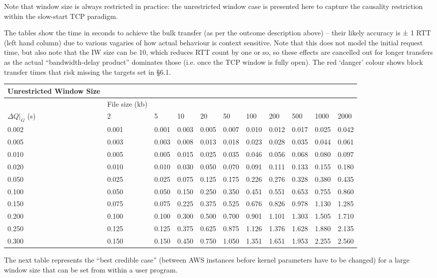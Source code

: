 \documentclass[11pt,a4paper]{article}
\begin{document}
Note that window size is always restricted in practice: the unrestricted
window case is presented here to capture the causality restriction
within the slow-start TCP paradigm.

The tables show the time in seconds to achieve the bulk transfer (as per
the outcome description above) -- their likely accuracy is ± 1 RTT (left
hand column) due to various vagaries of how actual behaviour is context
sensitive. Note that this does not model the initial request time, but
also note that the IW size can be 10, which reduces RTT count by one or
so, so these effects are cancelled out for longer transfers as the
actual ``bandwidth-delay product'' dominates those (i.e. once the TCP
window is fully open). The red `danger' colour shows block transfer
times that risk missing the targets set in §6.1.

\begin{longtable}[]{@{}lllllllllll@{}}
\toprule
Unrestricted Window Size & & & & & & & & & &\tabularnewline
\midrule
\endhead
& File size (kb) & & & & & & & & &\tabularnewline
$\Delta{}Q|_G$ (s) & 2 & 5 & 10 & 20 & 50 & 100 & 200 &
500 & 1000 & 2000\tabularnewline
0.002 & 0.001 & 0.001 & 0.003 & 0.005 & 0.007 & 0.010 & 0.012 & 0.017 &
0.025 & 0.042\tabularnewline
0.005 & 0.003 & 0.003 & 0.008 & 0.013 & 0.018 & 0.023 & 0.028 & 0.035 &
0.044 & 0.061\tabularnewline
0.010 & 0.005 & 0.005 & 0.015 & 0.025 & 0.035 & 0.046 & 0.056 & 0.068 &
0.080 & 0.097\tabularnewline
0.020 & 0.010 & 0.010 & 0.030 & 0.050 & 0.070 & 0.091 & 0.111 & 0.133 &
0.155 & 0.180\tabularnewline
0.050 & 0.025 & 0.025 & 0.075 & 0.125 & 0.175 & 0.226 & 0.276 & 0.328 &
0.380 & 0.435\tabularnewline
0.100 & 0.050 & 0.050 & 0.150 & 0.250 & 0.350 & 0.451 & 0.551 & 0.653 &
0.755 & 0.860\tabularnewline
0.150 & 0.075 & 0.075 & 0.225 & 0.375 & 0.525 & 0.676 & 0.826 & 0.978 &
1.130 & 1.285\tabularnewline
0.200 & 0.100 & 0.100 & 0.300 & 0.500 & 0.700 & 0.901 & 1.101 & 1.303 &
1.505 & 1.710\tabularnewline
0.250 & 0.125 & 0.125 & 0.375 & 0.625 & 0.875 & 1.126 & 1.376 & 1.628 &
1.880 & 2.135\tabularnewline
0.300 & 0.150 & 0.150 & 0.450 & 0.750 & 1.050 & 1.351 & 1.651 & 1.953 &
2.255 & 2.560\tabularnewline
\bottomrule
\end{longtable}

The next table represents the ``best credible case'' (between AWS
instances before kernel parameters have to be changed) for a large
window size that can be set from within a user program.
\end{document}
